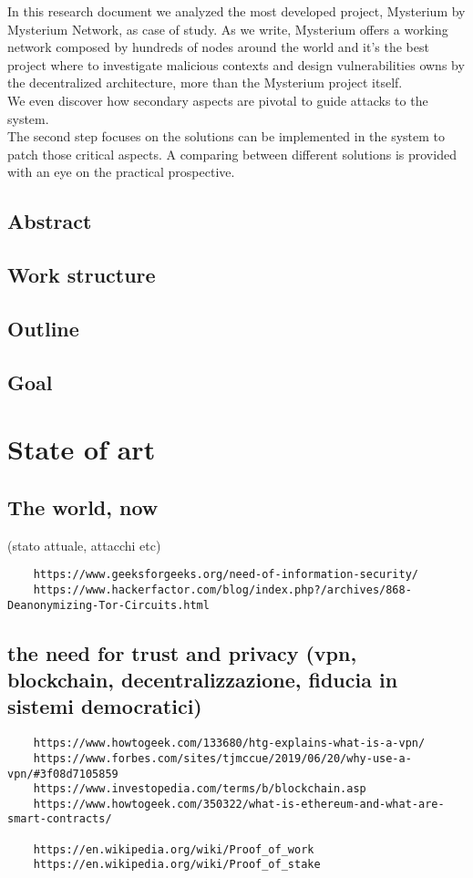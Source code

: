 \documentclass[]{article}
\begin{document}
	In this research document we analyzed the most developed project, Mysterium by Mysterium Network, as case of study. As we write, Mysterium offers a working network composed by hundreds of nodes around the world and it's the best project where to investigate malicious contexts and design vulnerabilities owns by the decentralized architecture, more than the Mysterium project itself.\\We even discover how secondary aspects are pivotal to guide attacks to the system.\\
	The second step focuses on the solutions can be implemented in the system to patch those critical aspects. A comparing between different solutions is provided with an eye on the practical prospective.\\
		
	
	\subsection{Abstract}
	\subsection{Work structure}
	\subsection{Outline}
	\subsection{Goal}
	
	
	\section{State of art}
	
	\subsection{The world, now}
	(stato attuale, attacchi etc)
	
	\begin{verbatim}
	https://www.geeksforgeeks.org/need-of-information-security/
	https://www.hackerfactor.com/blog/index.php?/archives/868-Deanonymizing-Tor-Circuits.html
	\end{verbatim}
	
	\subsection{the need for trust and privacy (vpn, blockchain, decentralizzazione, fiducia in sistemi democratici)}
	\begin{verbatim}
	https://www.howtogeek.com/133680/htg-explains-what-is-a-vpn/
	https://www.forbes.com/sites/tjmccue/2019/06/20/why-use-a-vpn/#3f08d7105859
	https://www.investopedia.com/terms/b/blockchain.asp
	https://www.howtogeek.com/350322/what-is-ethereum-and-what-are-smart-contracts/
	
	https://en.wikipedia.org/wiki/Proof_of_work
	https://en.wikipedia.org/wiki/Proof_of_stake
	\end{verbatim}
	
\end{document}
